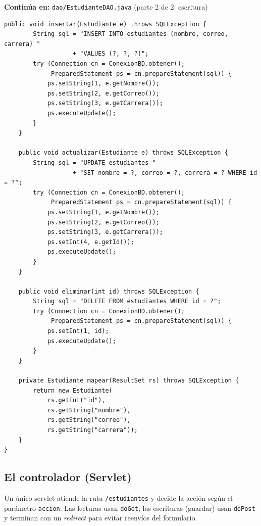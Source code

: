 \documentclass[11pt,a4paper,openany]{book}
\begin{document}
{\small\textbf{Continúa en:} \texttt{dao/EstudianteDAO.java} (parte 2 de 2: escritura)}
\begin{lstlisting}[style=java,caption={EstudianteDAO.java --- parte 2: insertar, actualizar, eliminar},label={lst:jsp-dao-b}]
    public void insertar(Estudiante e) throws SQLException {
        String sql = "INSERT INTO estudiantes (nombre, correo, carrera) "
                   + "VALUES (?, ?, ?)";
        try (Connection cn = ConexionBD.obtener();
             PreparedStatement ps = cn.prepareStatement(sql)) {
            ps.setString(1, e.getNombre());
            ps.setString(2, e.getCorreo());
            ps.setString(3, e.getCarrera());
            ps.executeUpdate();
        }
    }

    public void actualizar(Estudiante e) throws SQLException {
        String sql = "UPDATE estudiantes "
                   + "SET nombre = ?, correo = ?, carrera = ? WHERE id = ?";
        try (Connection cn = ConexionBD.obtener();
             PreparedStatement ps = cn.prepareStatement(sql)) {
            ps.setString(1, e.getNombre());
            ps.setString(2, e.getCorreo());
            ps.setString(3, e.getCarrera());
            ps.setInt(4, e.getId());
            ps.executeUpdate();
        }
    }

    public void eliminar(int id) throws SQLException {
        String sql = "DELETE FROM estudiantes WHERE id = ?";
        try (Connection cn = ConexionBD.obtener();
             PreparedStatement ps = cn.prepareStatement(sql)) {
            ps.setInt(1, id);
            ps.executeUpdate();
        }
    }

    private Estudiante mapear(ResultSet rs) throws SQLException {
        return new Estudiante(
            rs.getInt("id"),
            rs.getString("nombre"),
            rs.getString("correo"),
            rs.getString("carrera"));
    }
}
\end{lstlisting}

\subsection{El controlador (Servlet)}
\label{ap:crud:jsp:servlet}

Un único servlet atiende la ruta \texttt{/estudiantes} y decide la
acción según el parámetro \texttt{accion}. Las lecturas usan
\texttt{doGet}; las escrituras (guardar) usan \texttt{doPost} y
terminan con un \emph{redirect} para evitar reenvíos del formulario.
\end{document}
